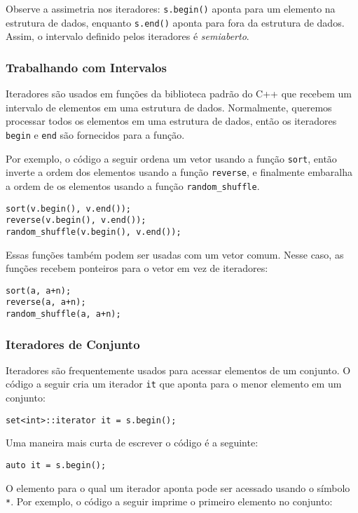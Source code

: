 Observe a assimetria nos iteradores:
\texttt{s.begin()} aponta para um elemento na estrutura de dados,
enquanto \texttt{s.end()} aponta para fora da estrutura de dados.
Assim, o intervalo definido pelos iteradores é \emph{semiaberto}.

\subsubsection{Trabalhando com Intervalos}

Iteradores são usados em funções da biblioteca padrão do C++
que recebem um intervalo de elementos em uma estrutura de dados.
Normalmente, queremos processar todos os elementos em uma
estrutura de dados, então os iteradores
\texttt{begin} e \texttt{end} são fornecidos para a função.

Por exemplo, o código a seguir ordena um vetor
usando a função \texttt{sort},
então inverte a ordem dos elementos usando a função
\texttt{reverse}, e finalmente embaralha a ordem de
os elementos usando a função \texttt{random\_shuffle}.


\begin{lstlisting}
sort(v.begin(), v.end());
reverse(v.begin(), v.end());
random_shuffle(v.begin(), v.end());
\end{lstlisting}

Essas funções também podem ser usadas com um vetor comum.
Nesse caso, as funções recebem ponteiros para o vetor
em vez de iteradores:

\newpage
\begin{lstlisting}
sort(a, a+n);
reverse(a, a+n);
random_shuffle(a, a+n);
\end{lstlisting}

\subsubsection{Iteradores de Conjunto}

Iteradores são frequentemente usados para acessar
elementos de um conjunto.
O código a seguir cria um iterador
\texttt{it} que aponta para o menor elemento em um conjunto:
\begin{lstlisting}
set<int>::iterator it = s.begin();
\end{lstlisting}
Uma maneira mais curta de escrever o código é a seguinte:
\begin{lstlisting}
auto it = s.begin();
\end{lstlisting}
O elemento para o qual um iterador aponta
pode ser acessado usando o símbolo \texttt{*}.
Por exemplo, o código a seguir imprime
o primeiro elemento no conjunto:

